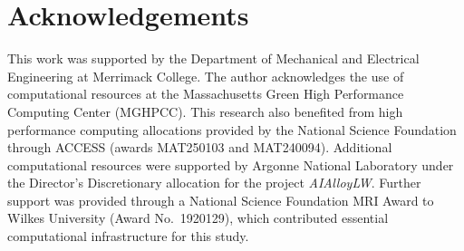 \documentclass[final,1p,times]{elsarticle}
\begin{document}
\section*{Acknowledgements}
This work was supported by the Department of Mechanical and Electrical Engineering at Merrimack College. The author acknowledges the use of computational resources at the Massachusetts Green High Performance Computing Center (MGHPCC). This research also benefited from high performance computing allocations provided by the National Science Foundation through ACCESS (awards MAT250103 and MAT240094). Additional computational resources were supported by Argonne National Laboratory under the Director's Discretionary allocation for the project \textit{AIAlloyLW}. Further support was provided through a National Science Foundation MRI Award to Wilkes University (Award No.\ 1920129), which contributed essential computational infrastructure for this study.



\end{document}
